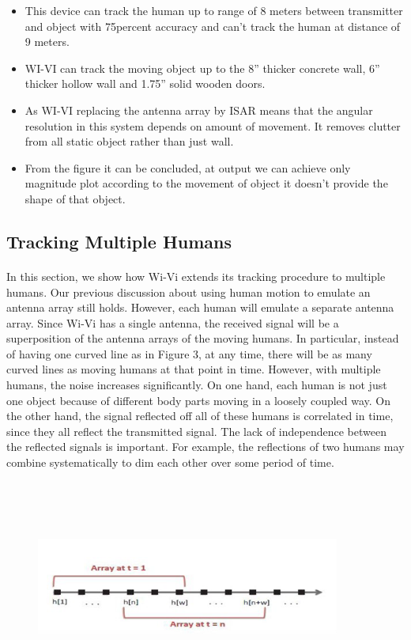 \documentclass[a4paper,12pt,oneside]{article}
\begin{document}
\begin{itemize}
    \item This device can track the human up to range of 8 meters between transmitter and object
with 75percent accuracy and can’t track the human at distance of 9 meters.
    \item  WI-VI can track the moving object up to the 8” thicker concrete wall, 6” thicker hollow
wall and 1.75” solid wooden doors.
    \item As WI-VI replacing the antenna array by ISAR means that the angular resolution in this
system depends on amount of movement. It removes clutter from all static object rather
than just wall.
	\item From the figure it can be concluded, at output we can achieve only magnitude plot
according to the movement of object it doesn’t provide the shape of that object.
\end{itemize}

\subsection{Tracking Multiple Humans}
\paragraph{}
In this section, we show how Wi-Vi extends its tracking procedure to multiple humans.
Our previous discussion about using human motion to emulate an antenna array still holds.
However, each human will emulate a separate antenna array. Since Wi-Vi has a single antenna,
the received signal will be a superposition of the antenna arrays of the moving humans. In
particular, instead of having one curved line as in Figure 3, at any time, there will be as many
curved lines as moving humans at that point in time. However, with multiple humans, the noise
increases significantly. On one hand, each human is not just one object because of different body
parts moving in a loosely coupled way. On the other hand, the signal reflected off all of these
humans is correlated in time, since they all reflect the transmitted signal. The lack of
independence between the reflected signals is important. For example, the reflections of two
humans may combine systematically to dim each other over some period of time.

\begin{figure}[H]
\centering
\includegraphics[height=7cm,width=10cm]{7.png}
\end{figure}
\end{document}
